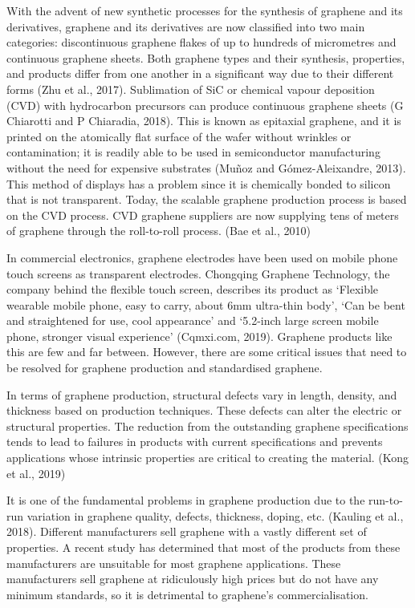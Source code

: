 \documentclass[a4paper,12pt]{article}
\numberwithin{equation}{section}
\numberwithin{figure}{section}
\begin{document}
\noindent With the advent of new synthetic processes for the synthesis of graphene and its derivatives, graphene and its derivatives are now classified into two main categories: discontinuous graphene flakes of up to hundreds of micrometres and continuous graphene sheets. Both graphene types and their synthesis, properties, and products differ from one another in a significant way due to their different forms (Zhu et al., 2017). Sublimation of SiC or chemical vapour deposition (CVD) with hydrocarbon precursors can produce continuous graphene sheets (G Chiarotti and P Chiaradia, 2018). This is known as epitaxial graphene, and it is printed on the atomically flat surface of the wafer without wrinkles or contamination; it is readily able to be used in semiconductor manufacturing without the need for expensive substrates (Muñoz and Gómez-Aleixandre, 2013). This method of displays has a problem since it is chemically bonded to silicon that is not transparent. Today, the scalable graphene production process is based on the CVD process. CVD graphene suppliers are now supplying tens of meters of graphene through the roll-to-roll process. (Bae et al., 2010)\vspace{\baselineskip}

\noindent In commercial electronics, graphene electrodes have been used on mobile phone touch screens as transparent electrodes. Chongqing Graphene Technology, the company behind the flexible touch screen, describes its product as ‘Flexible wearable mobile phone, easy to carry, about 6mm ultra-thin body’, ‘Can be bent and straightened for use, cool appearance’ and ‘5.2-inch large screen mobile phone, stronger visual experience’ (Cqmxi.com, 2019). Graphene products like this are few and far between. However, there are some critical issues that need to be resolved for graphene production and standardised graphene.\vspace{\baselineskip}

\noindent In terms of graphene production, structural defects vary in length, density, and thickness based on production techniques. These defects can alter the electric or structural properties. The reduction from the outstanding graphene specifications tends to lead to failures in products with current specifications and prevents applications whose intrinsic properties are critical to creating the material. (Kong et al., 2019)\vspace{\baselineskip}

\noindent It is one of the fundamental problems in graphene production due to the run-to-run variation in graphene quality, defects, thickness, doping, etc. (Kauling et al., 2018). Different manufacturers sell graphene with a vastly different set of properties. A recent study has determined that most of the products from these manufacturers are unsuitable for most graphene applications. These manufacturers sell graphene at ridiculously high prices but do not have any minimum standards, so it is detrimental to graphene's commercialisation.\vspace{\baselineskip}
\end{document}
